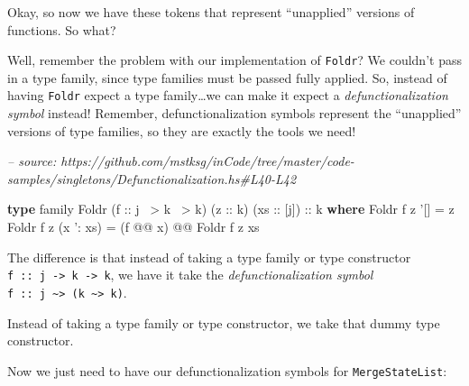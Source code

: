 \documentclass[]{article}
\newenvironment{Shaded}{}{}
\newcommand{\CommentTok}[1]{\textcolor[rgb]{0.38,0.63,0.69}{\textit{#1}}}
\newcommand{\DataTypeTok}[1]{\textcolor[rgb]{0.56,0.13,0.00}{#1}}
\newcommand{\FunctionTok}[1]{\textcolor[rgb]{0.02,0.16,0.49}{#1}}
\newcommand{\KeywordTok}[1]{\textcolor[rgb]{0.00,0.44,0.13}{\textbf{#1}}}
\newcommand{\NormalTok}[1]{#1}
\newcommand{\OtherTok}[1]{\textcolor[rgb]{0.00,0.44,0.13}{#1}}
\begin{document}
Okay, so now we have these tokens that represent ``unapplied'' versions of
functions. So what?

Well, remember the problem with our implementation of \texttt{Foldr}? We
couldn't pass in a type family, since type families must be passed fully
applied. So, instead of having \texttt{Foldr} expect a type family\ldots{}we can
make it expect a \emph{defunctionalization symbol} instead! Remember,
defunctionalization symbols represent the ``unapplied'' versions of type
families, so they are exactly the tools we need!

\begin{Shaded}
\begin{Highlighting}[]
\CommentTok{-- source: https://github.com/mstksg/inCode/tree/master/code-samples/singletons/Defunctionalization.hs#L40-L42}

\KeywordTok{type}\NormalTok{ family }\DataTypeTok{Foldr}\NormalTok{ (}\OtherTok{f ::}\NormalTok{ j }\FunctionTok{~>}\NormalTok{ k }\FunctionTok{~>}\NormalTok{ k) (}\OtherTok{z ::}\NormalTok{ k) (}\OtherTok{xs ::}\NormalTok{ [j])}\OtherTok{ ::}\NormalTok{ k }\KeywordTok{where}
    \DataTypeTok{Foldr}\NormalTok{ f z '[]       }\FunctionTok{=}\NormalTok{ z}
    \DataTypeTok{Foldr}\NormalTok{ f z (x '}\FunctionTok{:}\NormalTok{ xs) }\FunctionTok{=}\NormalTok{ (f }\FunctionTok{@@}\NormalTok{ x) }\FunctionTok{@@} \DataTypeTok{Foldr}\NormalTok{ f z xs}
\end{Highlighting}
\end{Shaded}

The difference is that instead of taking a type family or type constructor
\texttt{f\ ::\ j\ -\textgreater{}\ k\ -\textgreater{}\ k}, we have it take the
\emph{defunctionalization symbol}
\texttt{f\ ::\ j\ \textasciitilde{}\textgreater{}\ (k\ \textasciitilde{}\textgreater{}\ k)}.

Instead of taking a type family or type constructor, we take that dummy type
constructor.

Now we just need to have our defunctionalization symbols for
\texttt{MergeStateList}:
\end{document}
